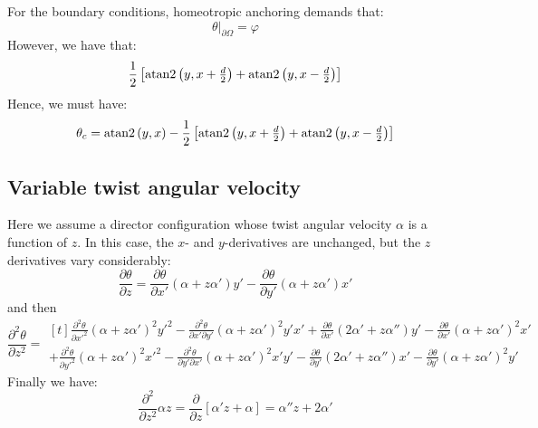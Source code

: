 \documentclass[reqno]{article}
\begin{document}
For the boundary conditions, homeotropic anchoring demands that:
\begin{equation}
    \left.\theta \right|_{\partial \Omega}
    =
    \varphi
\end{equation}
However, we have that:
\begin{equation}
    \frac12 \left[
        \operatorname{atan2} \left(y, x + \tfrac{d}{2}\right)
        + \operatorname{atan2} \left(y, x - \tfrac{d}{2}\right)
    \right]
\end{equation}
Hence, we must have:
\begin{equation}
    \theta_c
    =
    \operatorname{atan2} \left(y, x \right)
    -
    \frac12 \left[
        \operatorname{atan2} \left(y, x + \tfrac{d}{2}\right)
        + \operatorname{atan2} \left(y, x - \tfrac{d}{2}\right)
    \right]
\end{equation}

\subsection{Variable twist angular velocity}

Here we assume a director configuration whose twist angular velocity $\alpha$ is a function of $z$.
In this case, the $x$- and $y$-derivatives are unchanged, but the $z$ derivatives vary considerably:
\begin{equation}
    \frac{\partial \theta}{\partial z}
    =
    \frac{\partial \theta}{\partial x'} (\alpha + z\alpha') y'
    -
    \frac{\partial \theta}{\partial y'} (\alpha + z \alpha') x'
\end{equation}
and then
\begin{equation}
    \frac{\partial^2 \theta}{\partial z^2}
    =
    \begin{multlined}[t]
        \frac{\partial^2 \theta}{\partial x'^2} (\alpha + z\alpha')^2 y'^2
        -
        \frac{\partial^2 \theta}{\partial x' \partial y'} (\alpha + z\alpha')^2 y' x'
        +
        \frac{\partial \theta}{\partial x'} (2 \alpha' + z \alpha'') y'
        -
        \frac{\partial \theta}{\partial x'} (\alpha + z\alpha')^2 x' \\
        +
        \frac{\partial^2 \theta}{\partial y'^2} (\alpha + z \alpha')^2 x'^2
        -
        \frac{\partial^2 \theta}{\partial y' \partial x'} (\alpha + z \alpha')^2 x' y'
        -
        \frac{\partial \theta}{\partial y'} (2 \alpha' + z \alpha'') x'
        -
        \frac{\partial \theta}{\partial y'} (\alpha + z \alpha')^2 y'
    \end{multlined}
\end{equation}
Finally we have:
\begin{equation}
    \frac{\partial^2}{\partial z^2} \alpha z
    =
    \frac{\partial}{\partial z} \left[
        \alpha' z + \alpha
    \right]
    =
    \alpha'' z + 2 \alpha'
\end{equation}
\end{document}
